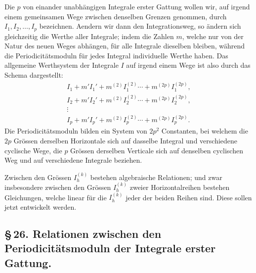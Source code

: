\documentclass[10pt]{article}
\begin{document}
Die \(p\) von einander unabhängigen Integrale erster Gattung wollen wir, auf irgend einem gemeinsamen Wege zwischen denselben Grenzen genommen, durch \(I_1,I_2,\ldots,I_p\) bezeichnen. Aendern wir dann den Integrationsweg, so ändern sich gleichzeitig die Werthe aller Integrale; indem die Zahlen \(m\), welche nur von der Natur des neuen Weges abhängen, für alle Integrale dieselben bleiben, während die Periodicitätsmoduln für jedes Integral individuelle Werthe haben. Das allgemeine Werthsystem der Integrale \(I\) auf irgend einem Wege ist also durch das Schema dargestellt:
\[
\begin{gathered}
I_1+m'I_1'+m^{(2)}I_1^{(2)}\cdots+m^{(2p)}I_1^{(2p)},\\
I_2+m'I_2'+m^{(2)}I_2^{(2)}\cdots+m^{(2p)}I_2^{(2p)},\\
\vdots\\
I_p+m'I_p'+m^{(2)}I_p^{(2)}\cdots+m^{(2p)}I_p^{(2p)}.
\end{gathered}
\]
Die Periodicitätsmoduln bilden ein System von \(2p^2\) Constanten, bei welchem die \(2p\) Grössen derselben Horizontale sich auf dasselbe Integral und verschiedene cyclische Wege, die \(p\) Grössen derselben Verticale sich auf denselben cyclischen Weg und auf verschiedene Integrale beziehen.

Zwischen den Grössen \(I_h^{(k)}\) bestehen algebraische Relationen; und zwar insbesondere zwischen den Grössen \(I_h^{(k)}\) zweier Horizontalreihen bestehen Gleichungen, welche linear für die \(I_h^{(k)}\) jeder der beiden Reihen sind. Diese sollen jetzt entwickelt werden.

\subsection*{\S\,26. Relationen zwischen den Periodicitätsmoduln der Integrale erster Gattung.\footnotemark}
\end{document}
